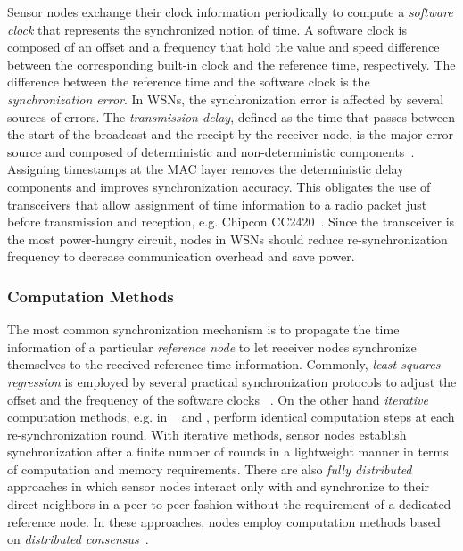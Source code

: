 \documentclass[journal,draftcls,onecolumn,12pt,twoside]{IEEEtranTCOM}
\begin{document}
Sensor nodes exchange their clock information periodically to compute a \emph{software clock} that represents the synchronized notion of time. A software clock is composed of an offset and a frequency that hold the value and speed difference between the corresponding built-in clock and the reference time, respectively. The difference between the reference time and the software clock is the \emph{synchronization error}. In WSNs, the synchronization error is affected by several sources of errors. The \emph{transmission delay}, defined as the time that passes between the start of the broadcast and the receipt by the receiver node, is the major error source and composed of deterministic and non-deterministic components~\cite{Maroti2004}. Assigning timestamps at the MAC layer removes the deterministic delay components and improves synchronization accuracy. This obligates the use of transceivers that allow assignment of time information to a radio packet just before transmission and reception, e.g. Chipcon CC2420~\cite{chipcon:cc2420}. Since the transceiver is the most power-hungry circuit, nodes in WSNs should reduce re-synchronization frequency to decrease communication overhead and save power.

\subsubsection{Computation Methods}

The most common synchronization mechanism is to propagate the time information of a particular \emph{reference node} to let receiver nodes synchronize themselves to the received reference time information. Commonly, \emph{least-squares regression} is employed by several practical synchronization protocols to adjust the offset and the frequency of the software clocks ~\cite{Maroti2004,Lenzen:2015,TATS:2016}. On the other hand \emph{iterative} computation methods, e.g. in ~\cite{Yildirim:AVTS:2014,pi2015} and \cite{Yildirim:Gradient:2016}, perform identical computation steps at each re-synchronization round. With iterative methods, sensor nodes establish synchronization after a finite number of rounds in a lightweight manner in terms of computation and memory requirements. There are also \emph{fully distributed} approaches in which sensor nodes interact only with and synchronize to their direct neighbors in a peer-to-peer fashion without the requirement of a dedicated reference node. In these approaches, nodes employ computation methods based on \emph{distributed consensus}~\cite{Sommer2009Gradient,SchenatoFiorentin:2011,Yildirim:External:2014}. 
\end{document}
